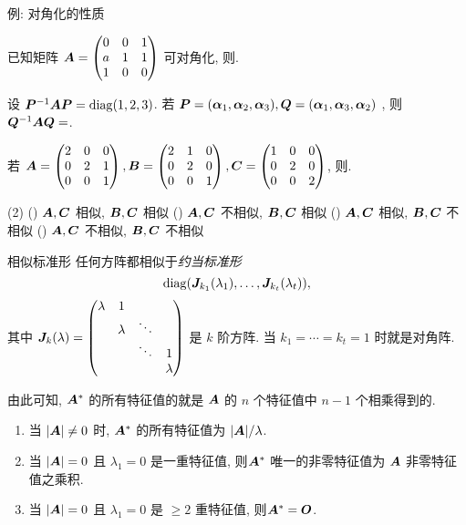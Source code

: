 \begin{frame}{例: 对角化的性质}\small
\beqskip{4pt}
	\onslide<+->
	\begin{exercise}
		已知矩阵 ${\boldsymbol{A}}=\begin{pmatrix}
			0&0&1\\
			a&1&1\\
			1&0&0
		\end{pmatrix}$ 可对角化, 则.
	\end{exercise}
	\onslide<+->
	\begin{exercise}
		设 ${\boldsymbol{P}}^{-1}{\boldsymbol{A}}{\boldsymbol{P}}={\mathrm{diag}}(1,2,3)$.
		若 ${\boldsymbol{P}}=({\boldsymbol{\alpha}}_1,{\boldsymbol{\alpha}}_2,{\boldsymbol{\alpha}}_3),{\boldsymbol{Q}}=({\boldsymbol{\alpha}}_1,{\boldsymbol{\alpha}}_3,{\boldsymbol{\alpha}}_2)$	, 则 ${\boldsymbol{Q}}^{-1}{\boldsymbol{A}}{\boldsymbol{Q}}=$\fillblank[2cm]{\visible<+->{$\diag(1,3,2)$}}.
	\end{exercise}
	\onslide<+->
	\begin{exercise}
		若 ${\boldsymbol{A}}=\begin{pmatrix}
			2&0&0\\
			0&2&1\\
			0&0&1
		\end{pmatrix},{\boldsymbol{B}}=\begin{pmatrix}
			2&1&0\\
			0&2&0\\
			0&0&1
		\end{pmatrix},{\boldsymbol{C}}=\begin{pmatrix}
			1&0&0\\
			0&2&0\\
			0&0&2
		\end{pmatrix}$, 则\fillbrace{\visible<+->{C}}.
		\begin{taskschoice}(2)
			() ${\boldsymbol{A}},{\boldsymbol{C}}$ 相似, ${\boldsymbol{B}},{\boldsymbol{C}}$ 相似
			() ${\boldsymbol{A}},{\boldsymbol{C}}$ 不相似, ${\boldsymbol{B}},{\boldsymbol{C}}$ 相似
			() ${\boldsymbol{A}},{\boldsymbol{C}}$ 相似, ${\boldsymbol{B}},{\boldsymbol{C}}$ 不相似
			() ${\boldsymbol{A}},{\boldsymbol{C}}$ 不相似, ${\boldsymbol{B}},{\boldsymbol{C}}$ 不相似
		\end{taskschoice}
	\end{exercise}
\endgroup
\end{frame}


\begin{frame}{相似标准形\noexer}
	\onslide<+->
	任何方阵都相似于\emph{约当标准形}
	\[{\mathrm{diag}}({\boldsymbol{J}}_{k_1}(\lambda_1),\dots,{\boldsymbol{J}}_{k_t}(\lambda_t)),\]
	其中 ${\boldsymbol{J}}_k(\lambda)=\begin{pmatrix}
		\lambda&1&&\\
		&\lambda&\ddots&\\
		&&\ddots&1\\
		&&&\lambda
	\end{pmatrix}$ 是 $k$ 阶方阵.
	\onslide<+->
	当 $k_1=\cdots=k_t=1$ 时就是对角阵.

	\onslide<+->
	由此可知, \alert{${\boldsymbol{A}}^*$ 的所有特征值的就是 ${\boldsymbol{A}}$ 的 $n$ 个特征值中 $n-1$ 个相乘得到的}.
	\begin{enumerate}
		\item 当 $|{\boldsymbol{A}}|\neq0$ 时, ${\boldsymbol{A}}^*$ 的所有特征值为 $|{\boldsymbol{A}}|/\lambda$.
		\item 当 $|{\boldsymbol{A}}|=0$ 且 $\lambda_1=0$ 是一重特征值, 则${\boldsymbol{A}}^*$ 唯一的非零特征值为 ${\boldsymbol{A}}$ 非零特征值之乘积.
		\item 当 $|{\boldsymbol{A}}|=0$ 且 $\lambda_1=0$ 是 $\ge2$ 重特征值, 则${\boldsymbol{A}}^*={\boldsymbol{O}}$.
	\end{enumerate}
\end{frame}


